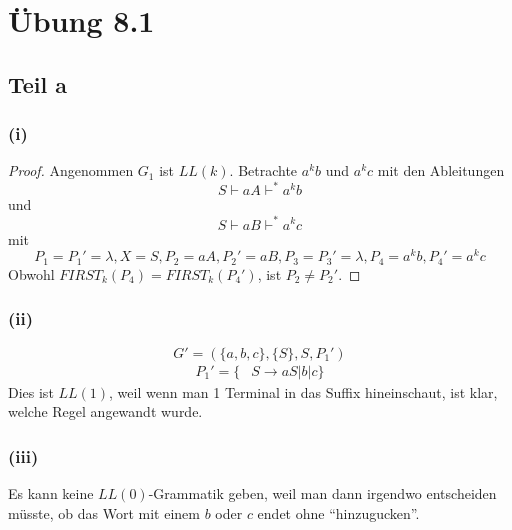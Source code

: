 \documentclass[10pt,a4paper]{article}
\begin{document}
\section{Übung 8.1}

\subsection{Teil a}

\subsubsection{(i)}

\begin{proof}
  Angenommen $G_{1}$ ist $LL(k)$.
  Betrachte $a^{k}b$ und $a^{k}c$ mit den Ableitungen
  \begin{equation}
    S \vdash aA \vdash^{*} a^{k}b
  \end{equation}
  und
  \begin{equation}
    S \vdash aB \vdash^{*} a^{k}c
  \end{equation}
  mit
  \begin{equation}
    P_{1} = P_{1}' = \lambda, X = S, P_{2} = aA, P_{2}' = aB, P_{3} = P_{3}' = \lambda, P_{4} = a^{k}b, P_{4}' = a^{k}c
  \end{equation}
  Obwohl $FIRST_{k}(P_{4}) = FIRST_{k}(P_{4}')$, ist $P_{2} \ne P_{2}'$.
\end{proof}

\subsubsection{(ii)}

\begin{equation}
  G' = (\{ a, b, c \}, \{ S \}, S, P_{1}')
\end{equation}
\begin{align*}
  P_{1}' = \{ & S \rightarrow aS | b | c \}
\end{align*}
Dies ist $LL(1)$, weil wenn man 1 Terminal in das Suffix hineinschaut, ist klar, welche Regel angewandt wurde.

\subsubsection{(iii)}

Es kann keine $LL(0)$-Grammatik geben, weil man dann irgendwo entscheiden müsste, ob das Wort mit einem $b$ oder $c$ endet ohne ``hinzugucken''.
\end{document}
